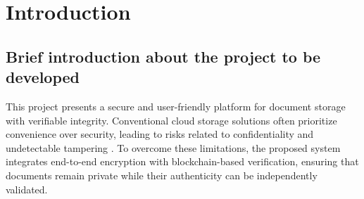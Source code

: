 \documentclass[12pt]{article}
\begin{document}
\begin{abstract}
\doublespacing
Blockchain Secure Document Vault is a trustless document management system that integrates end-to-end encryption, decentralized storage, and blockchain-based integrity verification. The platform addresses critical limitations of centralized cloud storage solutions by enabling organizations operating in compliance-intensive sectors such as legal, healthcare, and finance to maintain complete control over document security while generating immutable proof of file integrity and access history.

The system follows a hybrid architecture in which documents are encrypted locally using the AES-256 encryption standard and hashed using the SHA-256 algorithm. Encrypted files are stored on the InterPlanetary File System (IPFS) to ensure decentralized availability, while cryptographic integrity hashes are committed to a blockchain ledger to provide tamper-proof verification. Users retain full ownership of cryptographic keys, ensuring a trustless security model, while benefiting from a transparent and verifiable audit trail that reduces reliance on manual compliance audits.

The technology stack includes Next.js and React for the frontend, Node.js with Express and MongoDB for backend services, Solidity-based smart contracts for integrity proofs, and IPFS for distributed storage. The project has been fully developed and tested, achieving stable performance and secure operation, making it suitable for real-world deployment.
\end{abstract}
\newpage
\tableofcontents
\newpage


\newpage
\section{Introduction}

\subsection{Brief introduction about the project to be developed}

This project presents a secure and user-friendly platform for document storage with verifiable integrity. Conventional cloud storage solutions often prioritize convenience over security, leading to risks related to confidentiality and undetectable tampering \cite{stallings2017}. To overcome these limitations, the proposed system integrates end-to-end encryption with blockchain-based verification, ensuring that documents remain private while their authenticity can be independently validated.
\end{document}
